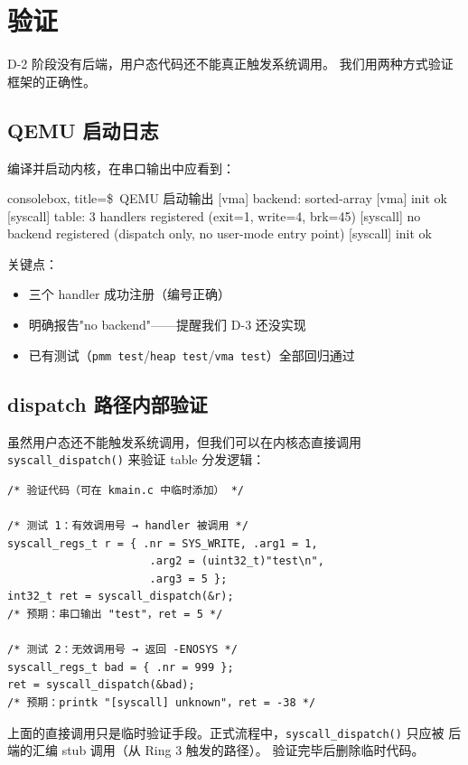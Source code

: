 \section{验证}
\label{sec:syscall-verify}

D-2 阶段没有后端，用户态代码还不能真正触发系统调用。
我们用两种方式验证框架的正确性。

\subsection{QEMU 启动日志}

编译并启动内核，在串口输出中应看到：

\begin{tcblisting}{consolebox, title={\textcolor{sol-green}{\$}~QEMU 启动输出}}
[vma] backend: sorted-array
[vma] init ok
[syscall] table: 3 handlers registered (exit=1, write=4, brk=45)
[syscall] no backend registered (dispatch only, no user-mode entry point)
[syscall] init ok
\end{tcblisting}

关键点：
\begin{itemize}
  \item 三个 handler 成功注册（编号正确）
  \item 明确报告"no backend"——提醒我们 D-3 还没实现
  \item 已有测试（\texttt{pmm test}/\texttt{heap test}/\texttt{vma test}）全部回归通过
\end{itemize}

\subsection{dispatch 路径内部验证}

虽然用户态还不能触发系统调用，但我们可以在内核态直接调用
\texttt{syscall\_dispatch()} 来验证 table 分发逻辑：

\begin{lstlisting}[style=cstyle]
/* 验证代码（可在 kmain.c 中临时添加） */

/* 测试 1：有效调用号 → handler 被调用 */
syscall_regs_t r = { .nr = SYS_WRITE, .arg1 = 1,
                      .arg2 = (uint32_t)"test\n",
                      .arg3 = 5 };
int32_t ret = syscall_dispatch(&r);
/* 预期：串口输出 "test"，ret = 5 */

/* 测试 2：无效调用号 → 返回 -ENOSYS */
syscall_regs_t bad = { .nr = 999 };
ret = syscall_dispatch(&bad);
/* 预期：printk "[syscall] unknown"，ret = -38 */
\end{lstlisting}

\begin{warnbox}
上面的直接调用只是临时验证手段。正式流程中，\texttt{syscall\_dispatch()} 只应被
后端的汇编 stub 调用（从 Ring 3 触发的路径）。
验证完毕后删除临时代码。
\end{warnbox}
